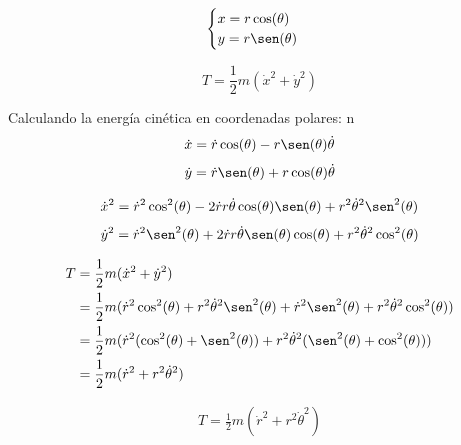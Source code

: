 \begin{equation*}
    \begin{cases}
        x=r\cos(\theta)\\
        y=r\sen(\theta)
    \end{cases}
\end{equation*}

\begin{equation*}
    T=\frac{1}{2}m(\dot{x}^2+\dot{y}^2)
\end{equation*}

Calculando la energía cinética en coordenadas polares:
n
\begin{equation*}
    \dot{x}=\dot{r}\cos(\theta)-r\sen(\theta)\dot{\theta}
\end{equation*}
\begin{equation*}
    \dot{y}=\dot{r}\sen(\theta)+r\cos(\theta)\dot{\theta}
\end{equation*}

\begin{equation*}
    \dot{x}^2=\dot{r}^2\cos^2(\theta)-
    2\dot{r}r\dot{\theta}\cos(\theta)\sen(\theta)+
    r^2\dot{\theta}^2\sen^2(\theta)
\end{equation*}
\begin{equation*}
    \dot{y}^2=\dot{r}^2\sen^2(\theta)+
    2\dot{r}r\dot{\theta}\sen(\theta)\cos(\theta)+
    r^2\dot{\theta}^2\cos^2(\theta)
\end{equation*}

\begin{equation*}
\begin{split}
    T&=\frac{1}{2}m(\dot{x}^2+\dot{y}^2)\\
     &=\frac{1}{2}m(\dot{r}^2\cos^2(\theta)+
       r^2\dot{\theta}^2\sen^2(\theta)+
       \dot{r}^2\sen^2(\theta)+
       r^2\dot{\theta}^2\cos^2(\theta))\\
     &=\frac{1}{2}m(\dot{r}^2(\cos^2(\theta)+
       \sen^2(\theta))+
       r^2\dot{\theta}^2(\sen^2(\theta)+
       \cos^2(\theta)))\\
     &=\frac{1}{2}m(\dot{r}^2+
       r^2\dot{\theta}^2)\\
\end{split}
\end{equation*}

\begin{equation}
\boxed{
    \begin{array}{l}
        T=\frac{1}{2}m(\dot{r}^2+r^2\dot{\theta}^2)
    \end{array}
}
\end{equation}

